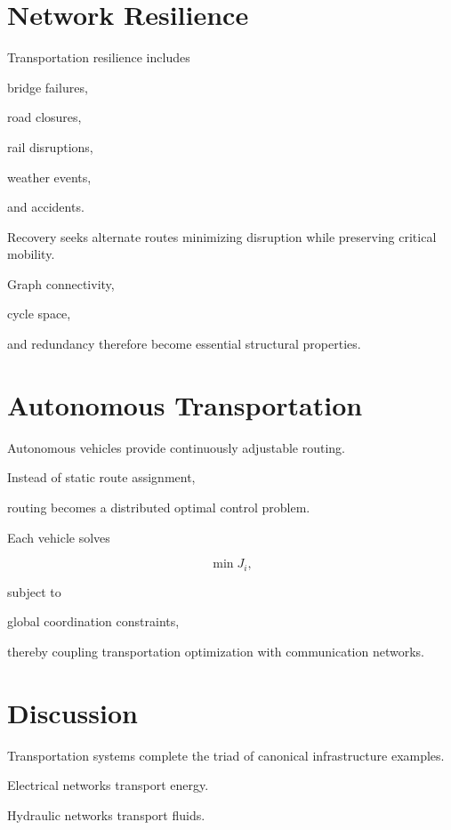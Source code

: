 \documentclass[11pt,fleqn]{book}
\numberwithin{equation}{chapter}
\theoremstyle{plain}
\theoremstyle{definition}
\theoremstyle{remark}
\begin{document}

\section{Network Resilience}

Transportation resilience includes

bridge failures,

road closures,

rail disruptions,

weather events,

and accidents.

Recovery seeks alternate routes minimizing disruption while preserving
critical mobility.

Graph connectivity,

cycle space,

and redundancy therefore become essential structural properties.


\section{Autonomous Transportation}

Autonomous vehicles provide continuously adjustable routing.

Instead of static route assignment,

routing becomes a distributed optimal control problem.

Each vehicle solves

\[
\min
J_i,
\]

subject to

global coordination constraints,

thereby coupling transportation optimization with communication
networks.


\section{Discussion}

Transportation systems complete the triad of canonical infrastructure
examples.

Electrical networks transport energy.

Hydraulic networks transport fluids.
\end{document}
